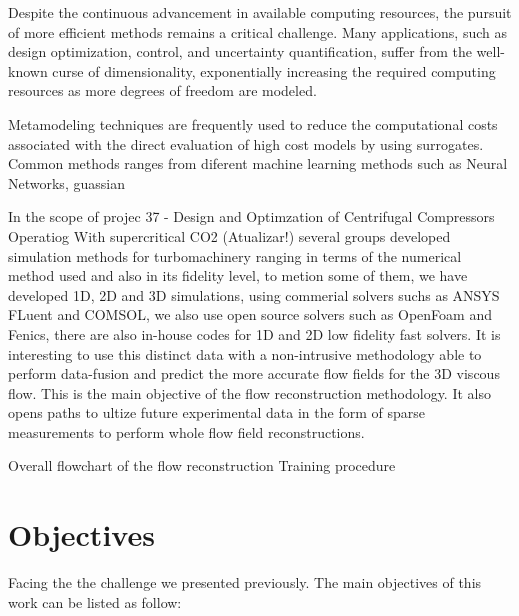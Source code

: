 Despite the continuous advancement in available computing resources, the pursuit of more efficient methods remains a critical challenge. Many applications, such as design optimization, control, and uncertainty quantification, suffer from the well-known curse of dimensionality, exponentially increasing the required computing resources as more degrees of freedom are modeled. 

Metamodeling techniques are frequently used to reduce the computational costs associated with the direct evaluation of high cost models by using surrogates. Common methods ranges from diferent machine learning methods such as Neural Networks, guassian 

In the scope of projec 37 - Design and Optimzation of Centrifugal Compressors Operatiog With supercritical CO2 (Atualizar!) several groups developed simulation methods for turbomachinery ranging in terms of the numerical method used and also in its fidelity level, to metion some of them, we have developed 1D, 2D and 3D simulations, using commerial solvers suchs as ANSYS FLuent and COMSOL, we also use open source solvers such as OpenFoam and Fenics, there are also in-house codes for 1D and 2D low fidelity fast solvers. It is interesting to use this distinct data with a non-intrusive methodology able to perform data-fusion and predict the more accurate flow fields for the 3D viscous flow. This is the main objective of the flow reconstruction methodology. It also opens paths to ultize future experimental data in the form of sparse measurements to perform whole flow field reconstructions.

Overall flowchart of the flow reconstruction Training procedure

\section{Objectives}

Facing the the challenge we presented previously. The main objectives of this work can be listed as follow:

